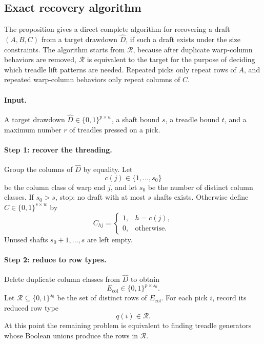 \documentclass[11pt]{article}
\begin{document}
\subsection*{Exact recovery algorithm}

The proposition gives a direct complete algorithm for recovering a draft
\((A,B,C)\) from a target drawdown \(\widehat{D}\), if such a draft exists under
the size constraints. The algorithm starts from \(\mathcal{R}\), because after
duplicate warp-column behaviors are removed, \(\mathcal{R}\) is equivalent to
the target for the purpose of deciding which treadle lift patterns are needed.
Repeated picks only repeat rows of \(A\), and repeated warp-column behaviors
only repeat columns of \(C\).

\paragraph{Input.}
A target drawdown \(\widehat{D}\in\{0,1\}^{p\times w}\), a shaft bound \(s\), a
treadle bound \(t\), and a maximum number \(r\) of treadles pressed on a pick.

\paragraph{Step 1: recover the threading.}
Group the columns of \(\widehat{D}\) by equality. Let
\[
  c(j)\in\{1,\dots,s_0\}
\]
be the column class of warp end \(j\), and let \(s_0\) be the number of distinct
column classes. If \(s_0>s\), stop: no draft with at most \(s\) shafts exists.
Otherwise define \(C\in\{0,1\}^{s\times w}\) by
\[
  C_{h j}
  =
  \begin{cases}
    1, & h=c(j),\\
    0, & \text{otherwise}.
  \end{cases}
\]
Unused shafts \(s_0+1,\dots,s\) are left empty.

\paragraph{Step 2: reduce to row types.}
Delete duplicate column classes from \(\widehat{D}\) to obtain
\[
  E_{\mathrm{col}}\in\{0,1\}^{p\times s_0}.
\]
Let \(\mathcal{R}\subseteq\{0,1\}^{s_0}\) be the set of distinct rows of
\(E_{\mathrm{col}}\). For each pick \(i\), record its reduced row type
\[
  q(i)\in\mathcal{R}.
\]
At this point the remaining problem is equivalent to finding treadle generators
whose Boolean unions produce the rows in \(\mathcal{R}\).
\end{document}
